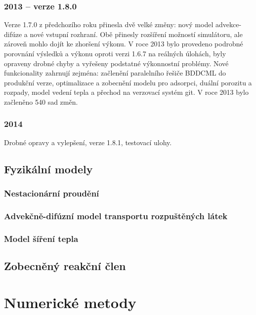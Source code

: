 \documentclass[11pt]{report}
\begin{document}
\subsubsection{2013 -- verze 1.8.0}
Verze 1.7.0 z předchozího roku přinesla dvě velké změny: nový model 
advekce-difúze a nové vstupní rozhraní. Obě přinesly rozšíření možností 
simulátoru, ale zároveň mohlo dojít ke zhoršení výkonu. V roce 2013 bylo 
provedeno podrobné porovnání výsledků a výkonu oproti verzi 1.6.7 na reálných 
úlohách, byly opraveny drobné chyby a vyřešeny podstatné výkonnostní problémy.  
Nové funkcionality zahrnují zejména: začlenění paralelního řešiče BDDCML do 
produkční verze, optimalizace a zobecnění modelu pro adsorpci, duální porozitu a 
rozpady, model vedení tepla a přechod na verzovací systém git. V roce 2013 bylo 
začleněno 540 sad změn.
\subsubsection{2014}
Drobné opravy a vylepšení, verze 1.8.1, testovací ulohy.

\subsection{Fyzikální modely}
\subsubsection{Nestacionární proudění}
\label{sc:darcy_flow}


\subsubsection{Advekčně-difúzní model transportu rozpuštěných látek}
\label{sc:transport_model}


\subsubsection{Model šíření tepla}
\label{sc:heat}


\subsection{Zobecněný reakční člen}


\section{Numerické metody}
\end{document}
